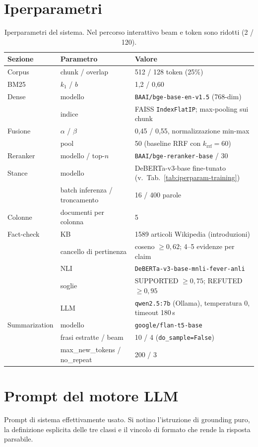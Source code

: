\documentclass[11pt,a4paper]{report}
\begin{document}
\chapter{Iperparametri}\label{app:iper}
\begin{table}[h]
\centering
\small
\begin{tabular}{lll}
\toprule
\textbf{Sezione} & \textbf{Parametro} & \textbf{Valore} \\
\midrule
Corpus & chunk / overlap & 512 / 128 token (25\%) \\
\midrule
BM25 & $k_1$ / $b$ & 1,2 / 0,60 \\
\midrule
Dense & modello & \texttt{BAAI/bge-base-en-v1.5} (768-dim) \\
 & indice & FAISS \texttt{IndexFlatIP}; max-pooling sui chunk \\
\midrule
Fusione & $\alpha$ / $\beta$ & 0,45 / 0,55, normalizzazione min-max \\
 & pool & 50 \; (baseline RRF con $k_{\text{rrf}} = 60$) \\
\midrule
Reranker & modello / top-$n$ & \texttt{BAAI/bge-reranker-base} / 30 \\
\midrule
Stance & modello & DeBERTa-v3-base fine-tunato (v.\ Tab.~\ref{tab:iperparam-training}) \\
 & batch inferenza / troncamento & 16 / 400 parole \\
\midrule
Colonne & documenti per colonna & 5 \\
\midrule
Fact-check & KB & 1589 articoli Wikipedia (introduzioni) \\
 & cancello di pertinenza & coseno $\ge 0{,}62$; 4--5 evidenze per claim \\
 & NLI & \texttt{DeBERTa-v3-base-mnli-fever-anli} \\
 & soglie & SUPPORTED $\ge 0{,}75$; REFUTED $\ge 0{,}95$ \\
 & LLM & \texttt{qwen2.5:7b} (Ollama), temperatura 0, timeout 180\,s \\
\midrule
Summarization & modello & \texttt{google/flan-t5-base} \\
 & frasi estratte / beam & 10 / 4 \; (\texttt{do\_sample=False}) \\
 & max\_new\_tokens / no\_repeat & 200 / 3 \\
\bottomrule
\end{tabular}
\caption{Iperparametri del sistema. Nel percorso interattivo beam e token sono ridotti (2 / 120).}
\end{table}

\chapter{Prompt del motore LLM}\label{app:prompt}
Prompt di sistema effettivamente usato. Si notino l'istruzione di grounding puro, la definizione
esplicita delle tre classi e il vincolo di formato che rende la risposta parsabile.
\end{document}
